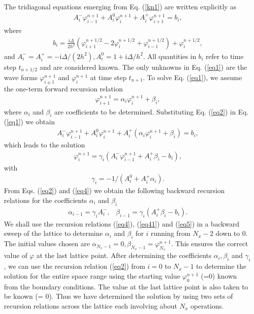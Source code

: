\documentclass[onecolumn]{elsart3p}
\begin{document}
The tridiagonal equations emerging from Eq. (\ref{kn1}) are written
explicitly as \cite{koonin}
\begin{align}\label{eq1}
A_i^-\varphi^{n+1}_{i-1}+A_i^0\varphi^{n+1}_{i}+
A_i^+\varphi^{n+1}_{i+1}= b_i,
\end{align}
where
\begin{align}
b_i=\frac{\mbox{i}\Delta}{2h^2}(\varphi^{n+1/2}_{i+1}-2\varphi_{i}^{n+1/2}
+\varphi^{n+1/2}_{i-1})+\varphi_i^{n+1/2},
\end{align}
and $A_i^-=A_i^+=  -\mbox{i}\Delta/(2h^2), A_i^0 = 1+\mbox{i}
\Delta/h^2$. All quantities in $b_i$ refer to time step $t_{n+1/2}$
and are considered known. The only unknowns in Eq. (\ref{eq1}) are the
wave forms $\varphi^{n+1}_{i\pm 1}$ and $\varphi^{n+1}_{i}$ at time
step $t_{n+1}$. To solve Eq. (\ref{eq1}), we assume the one-term
forward recursion relation
\begin{align}\label{eq2}
\varphi^{n+1}_{i+1}=\alpha_i\varphi^{n+1}_{i}+\beta_i,
\end{align}
where $\alpha_i$ and $\beta_i$ are coefficients to be determined.
Substituting Eq. (\ref{eq2}) in Eq. (\ref{eq1}) we obtain
\begin{align}\label{eq3}
A_i^-\varphi^{n+1}_{i-1}+A_i^0\varphi^{n+1}_{i}+
A_i^+(\alpha_i \varphi^{n+1}_{i}+\beta_i)= b_i,
\end{align}
which leads to the solution
\begin{align}\label{eq4}
\varphi_i^{n+1}=\gamma_i(A_i^- \varphi_{i-1}^{n+1}+A_i^+\beta_i-b_i),
\end{align}
with
\begin{align}\label{eq41}
\gamma_i=-1/(A_i^0+A_i^+\alpha_i).
\end{align}
From Eqs. (\ref{eq2}) and (\ref{eq4}) we obtain the following backward
recursion relations for the coefficients $\alpha_i$ and $\beta_i$
\begin{align}\label{eq5}
\alpha_{i-1}=\gamma_iA_i^-, \;\;\; \beta_{i-1}=
\gamma_i(A_i^+\beta_i-b_i).
\end{align}
We shall use the recursion relations (\ref{eq4}), (\ref{eq41}) and (\ref{eq5})
in a backward sweep of the lattice to determine $\alpha_i$ and $\beta_i$ for $i$
running from $N_x-2$ down to 0. The initial values chosen are $\alpha_{N_x-1}=0,
\beta_{N_x-1} = \varphi^{n+1}_{N_x}.$ This ensures the correct value of
$\varphi$ at the last lattice point. After determining the coefficients
$\alpha_i, \beta_i$ and $\gamma_i$, we can use the recursion relation
(\ref{eq2}) from $i=0$ to $N_x-1$ to determine the solution for the entire space
range using the starting value $\varphi^{n+1}_0$  (=0) known from the boundary
conditions. The value at the last lattice point is also taken to be known (= 0).
Thus we have determined the solution by using two sets of recursion relations
across the lattice each involving about $N_x$ operations.
\end{document}
